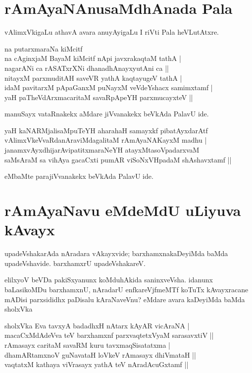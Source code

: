 \section*{rAmAyaNAnusaMdhAnada Pala}

vAlimxVkigaLu athavA avara anuyAyigaLu I riVti Pala heVLutAtxre. 

\begin{shloka} 
na putarxmaraNa kiMcitf\label{180}\\
na cAginxjaM BayaM kiMcitf nApi javxrakaqtaM tathA |\\ 
nagarANi ca rASATxrXNi dhanadhAnayxyutAni ca ||\\ 
nitayxM parxmuditAH saveVR yathA kaqtayugeV tathA |\\ 
idaM pavitarxM pApaGanxM puNayxM veVdeYshacx samimxtamf |\label{181}\\ 
yaH paTheVdArxmacaritaM savaRpApeYH parxmucayxteV ||
\end{shloka} 

manuSayx vataRnakekx aMdare jiVvanakekx beVkAda PalavU ide. 

\begin{shloka} 
yaH kaNARMjalisaMpuTeYH aharahaH samayxkf pibatAyxdarAtf\label{181b}\\ 
vAlimxVkeVvaRdanAraviMdagalitaM rAmAyaNAKayxM madhu |\\ 
janamxvAyxdhijarAvipatitxmaraNeYH atayxMtasoVpadarxvaM\\ 
saMsAraM sa vihAya gacaCxti pumAR viSoNxVHpadaM shAshavxtamf ||
\end{shloka} 
eMbaMte parajiVvanakekx beVkAda PalavU ide. 

\section*{rAmAyaNavu eMdeMdU uLiyuva kAvayx} 

upadeVshakarAda nAradara vAkayxvide; barxhamxnakaDeyiMda baMda upadeVshavide. barxhamxrU upadeVshakareV. 

elilxyoV beVDa pakiSxyanunx koMduhAkida saninxveVsha. idanunx baLasikoMDu barxhamxnU, nAradarU enfkareVjfmeMTf {} koTuTx kAvayxracane mADisi parxsididhx paDisalu kAraNaveVnu? eMdare avara kaDeyiMda baMda sholxVka 

\begin{shloka}
sholxVka Eva tavxyA badadhxH nAtarx kAyAR vicAraNA |\label{181c}\\ 
macaCxMdAdeVva teV barxhamxnf parxvaqtetxVyaM sarasavxtiV ||\\ 
rAmasayx caritaM savaRM kuru tavxmaqSisatatxma |\\ 
dhamARtamxnoV guNavataH loVkeV rAmasayx dhiVmataH ||\\ 
vaqtatxM kathaya viVrasayx yathA teV nAradAcuGxtamf ||
\end{shloka} 

